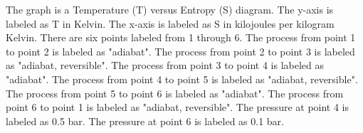 The graph is a Temperature (T) versus Entropy (S) diagram. The y-axis is labeled as T in Kelvin. The x-axis is labeled as S in kilojoules per kilogram Kelvin. There are six points labeled from 1 through 6. The process from point 1 to point 2 is labeled as "adiabat". The process from point 2 to point 3 is labeled as "adiabat, reversible". The process from point 3 to point 4 is labeled as "adiabat". The process from point 4 to point 5 is labeled as "adiabat, reversible". The process from point 5 to point 6 is labeled as "adiabat". The process from point 6 to point 1 is labeled as "adiabat, reversible". The pressure at point 4 is labeled as 0.5 bar. The pressure at point 6 is labeled as 0.1 bar.